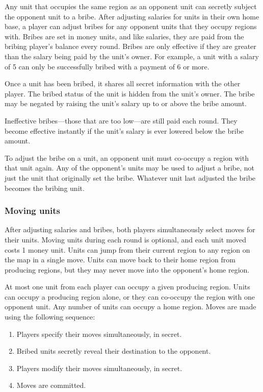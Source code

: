 \documentclass[12pt]{article}
\begin{document}
Any unit that occupies the same region as an opponent unit can secretly subject the opponent unit to a bribe.  After adjusting salaries for units in their own home base, a player can adjust bribes for any opponent units that they occupy regions with.  Bribes are set in money units, and like salaries, they are paid from the bribing player's balance every round.  Bribes are only effective if they are greater than the salary being paid by the unit's owner.  For example, a unit with a salary of 5 can only be successfully bribed with a payment of 6 or more.

Once a unit has been bribed, it shares all secret information with the other player.  The bribed status of the unit is hidden from the unit's owner.  The bribe may be negated by raising the unit's salary up to or above the bribe amount.

Ineffective bribes---those that are too low---are still paid each round.  They become effective instantly if the unit's salary is ever lowered below the bribe amount.

To adjust the bribe on a unit, an opponent unit must co-occupy a region with that unit again.  Any of the opponent's units may be used to adjust a bribe, not just the unit that originally set the bribe.  Whatever unit last adjusted the bribe becomes the bribing unit.

\subsubsection{Moving units}

After adjusting salaries and bribes, both players simultaneously select moves for their units.  Moving units during each round is optional, and each unit moved costs 1 money unit.  Units can jump from their current region to any region on the map in a single move.  Units can move back to their home region from producing regions, but they may never move into the opponent's home region.

At most one unit from each player can occupy a given producing region.  Units can occupy a producing region alone, or they can co-occupy the region with one opponent unit.  Any number of units can occupy a home region.  Moves are made using the following sequence:
\begin{enumerate}
\item Players specify their moves simultaneously, in secret.
\item Bribed units secretly reveal their destination to the opponent.
\item Players modify their moves simultaneously, in secret.
\item Moves are committed.
\end{enumerate}
\end{document}
